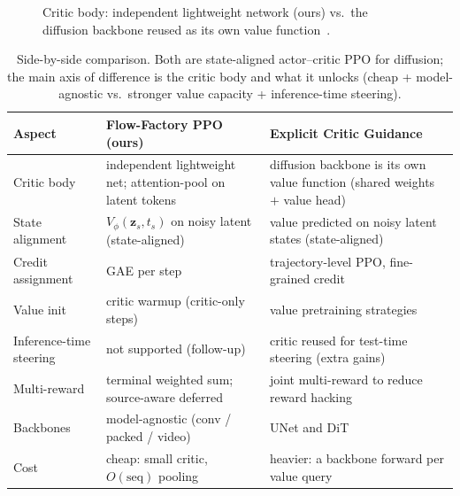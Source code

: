 \documentclass[11pt]{article}
\theoremstyle{plain}
\theoremstyle{remark}
\newcommand{\zt}{\bm{z}}
\begin{document}
\begin{figure}[h]
\centering
{}
\caption{Critic body: independent lightweight network (ours) vs.\ the diffusion
backbone reused as its own value function~\cite{liang2026critic}.}
\label{fig:critic-compare}
\end{figure}

\begin{table}[h]
\centering
\small
\begin{tabular}{p{3.1cm} p{5.3cm} p{5.3cm}}
\toprule
\textbf{Aspect} & \textbf{Flow-Factory PPO (ours)} & \textbf{Explicit Critic Guidance~\cite{liang2026critic}} \\
\midrule
Critic body & independent lightweight net; attention-pool on latent tokens & diffusion backbone is its own value function (shared weights $+$ value head) \\
State alignment & $V_\phi(\zt_s,t_s)$ on noisy latent (state-aligned) & value predicted on noisy latent states (state-aligned) \\
Credit assignment & GAE per step & trajectory-level PPO, fine-grained credit \\
Value init & critic warmup (critic-only steps) & value pretraining strategies \\
Inference-time steering & not supported (follow-up) & critic reused for test-time steering (extra gains) \\
Multi-reward & terminal weighted sum; source-aware deferred & joint multi-reward to reduce reward hacking \\
Backbones & model-agnostic (conv / packed / video) & UNet and DiT \\
Cost & cheap: small critic, $O(\mathrm{seq})$ pooling & heavier: a backbone forward per value query \\
\bottomrule
\end{tabular}
\caption{Side-by-side comparison. Both are state-aligned actor--critic PPO for
diffusion; the main axis of difference is the critic body and what it unlocks
(cheap + model-agnostic vs.\ stronger value capacity + inference-time steering).}
\label{tab:compare}
\end{table}
\end{document}

